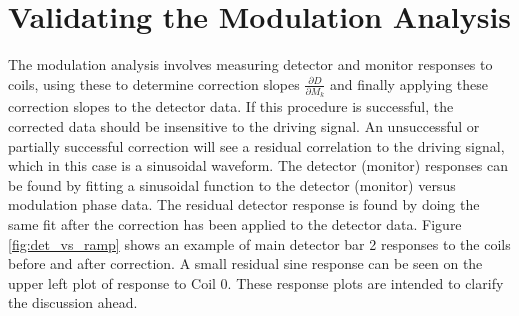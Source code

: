 \section{Validating the Modulation Analysis}
The modulation analysis involves measuring detector and monitor responses to coils, using these to determine correction slopes $\frac{\partial D}{\partial M_k}$ and finally applying these correction slopes to the detector data. If this procedure is successful, the corrected data should be insensitive to the driving signal. An unsuccessful or partially successful correction will see a residual correlation to the driving signal, which in this case is a sinusoidal waveform. The detector (monitor) responses can be found by fitting a sinusoidal function to the detector (monitor) versus modulation phase data. The residual detector response is found by doing the same fit after the correction has been applied to the detector data. Figure \ref{fig:det_vs_ramp} shows an example of main detector bar 2 responses to the coils before and after correction. A small residual sine response can be seen on the upper left plot of response to Coil 0. These response plots are intended to clarify the discussion ahead.
